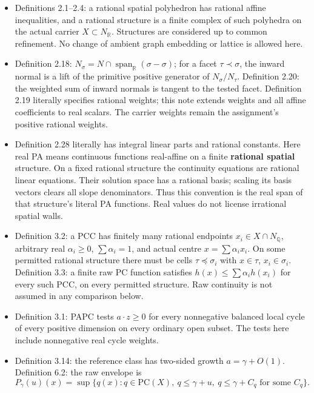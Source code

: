 \documentclass[
  10pt,
]{article}
\providecommand{\tightlist}{%
  \setlength{\itemsep}{0pt}\setlength{\parskip}{0pt}}
\begin{document}
\begin{itemize}
\tightlist
\item
  Definitions 2.1--2.4: a rational spatial polyhedron has rational
  affine inequalities, and a rational structure is a finite complex of
  such polyhedra on the actual carrier \(X\subset N_\mathbb R\).
  Structures are considered up to common refinement. No change of
  ambient graph embedding or lattice is allowed here.
\item
  Definition 2.18:
  \(N_\sigma=N\cap\operatorname{span}_\mathbb R(\sigma-\sigma)\); for a
  facet \(\tau\prec\sigma\), the inward normal is a lift of the
  primitive positive generator of \(N_\sigma/N_\tau\). Definition 2.20:
  the weighted sum of inward normals is tangent to the tested facet.
  Definition 2.19 literally specifies rational weights; this note
  extends weights and all affine coefficients to real scalars. The
  carrier weights remain the assignment's positive rational weights.
\item
  Definition 2.28 literally has integral linear parts and rational
  constants. Here real PA means continuous functions real-affine on a
  finite \textbf{rational spatial} structure. On a fixed rational
  structure the continuity equations are rational linear equations.
  Their solution space has a rational basis; scaling its basis vectors
  clears all slope denominators. Thus this convention is the real span
  of that structure's literal PA functions. Real values do not license
  irrational spatial walls.
\item
  Definition 3.2: a PCC has finitely many rational endpoints
  \(x_i\in X\cap N_\mathbb Q\), arbitrary real \(\alpha_i\geq0\),
  \(\sum\alpha_i=1\), and actual centre \(x=\sum\alpha_i x_i\). On some
  permitted rational structure there must be cells
  \(\tau\preceq\sigma_i\) with \(x\in\tau\), \(x_i\in\sigma_i\).
  Definition 3.3: a finite raw PC function satisfies
  \(h(x)\leq\sum\alpha_i h(x_i)\) for every such PCC, on every permitted
  structure. Raw continuity is not assumed in any comparison below.
\item
  Definition 3.1: PAPC tests \(a\cdot z\geq0\) for every nonnegative
  balanced local cycle of every positive dimension on every ordinary
  open subset. The tests here include nonnegative real cycle weights.
\item
  Definition 3.14: the reference class has two-sided growth
  \(a=\gamma+O(1)\). Definition 6.2: the raw envelope is \[
   P_\gamma(u)(x)=\sup\{q(x):q\in\mathrm{PC}(X),\ q\leq\gamma+u,
                                  \ q\leq\gamma+C_q\text{ for some }C_q\}. \tag{3}
\]
\end{itemize}
\end{document}

